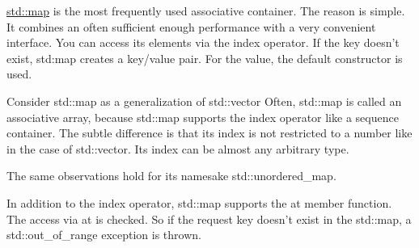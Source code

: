 

\href{http://en.cppreference.com/w/cpp/container/map}{std::map} is the most frequently used associative container. The reason is simple. It combines an often sufficient enough performance with a very convenient interface. You can access its elements via the index operator. If the key doesn’t exist, std:map creates a key/value pair. For the value, the default constructor is used.

\begin{myTip}{Consider std::map as a generalization of std::vector}
Often, std::map is called an associative array, because std::map supports the index operator like a sequence container. The subtle difference is that its index is not restricted to a number like in the case of std::vector. Its index can be almost any arbitrary type.

The same observations hold for its namesake std::unordered\_map.
\end{myTip}

In addition to the index operator, std::map supports the at member function. The access via at is checked. So if the request key doesn’t exist in the std::map, a std::out\_of\_range exception is thrown.


















































